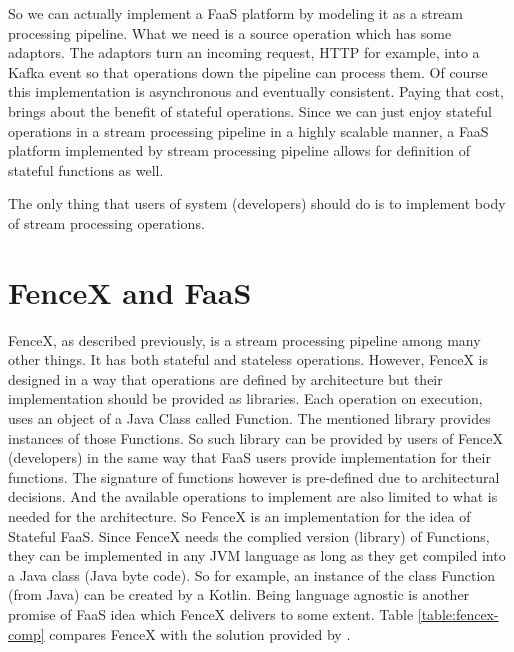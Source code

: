 \documentclass[a4]{report}
\begin{document}
    So we can actually implement a FaaS platform by modeling it as a stream processing pipeline.
    What we need is a source operation which has some adaptors.
    The adaptors turn an incoming request, HTTP for example, into a Kafka event so that operations down the pipeline
    can process them.
    Of course this implementation is asynchronous and eventually consistent.
    Paying that cost, brings about the benefit of stateful operations.
    Since we can just enjoy stateful operations in a stream processing pipeline in a highly scalable manner,
    a FaaS platform implemented by stream processing pipeline allows for definition of stateful functions as well.

    The only thing that users of system (developers) should do is to implement body of stream processing operations.


    \section{FenceX and FaaS}
    FenceX, as described previously, is a stream processing pipeline among many other things.
    It has both stateful and stateless operations.
    However, FenceX is designed in a way that operations are defined by architecture but their implementation should
    be provided as libraries.
    Each operation on execution, uses an object of a Java Class called Function.
    The mentioned library provides instances of those Functions.
    So such library can be provided by users of FenceX (developers) in the same way that FaaS users provide
    implementation for their functions.
    The signature of functions however is pre-defined due to architectural decisions.
    And the available operations to implement are also limited to what is needed for the architecture.
    So FenceX is an implementation for the idea of Stateful FaaS.
    Since FenceX needs the complied version (library) of Functions, they can be implemented in any JVM language as long
    as they get compiled into a Java class (Java byte code).
    So for example, an instance of the class Function (from Java) can be created by a Kotlin\cite{kotlin}.
    Being language agnostic is another promise of FaaS idea which FenceX delivers to some extent.
    Table \ref{table:fencex-comp} compares FenceX with the solution provided by \cite{Functions-as-a-Service-2020}.
\end{document}

